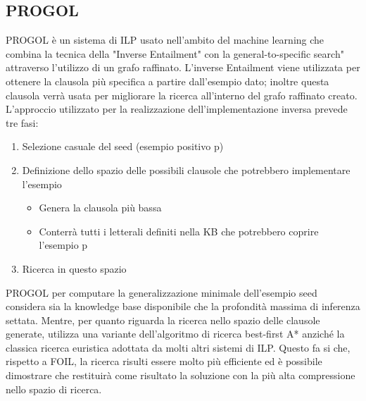 \subsection{PROGOL}
PROGOL è un sistema di ILP usato nell'ambito del machine learning che combina la tecnica della "Inverse Entailment" con la general-to-specific search" attraverso l'utilizzo di un grafo raffinato.
L'inverse Entailment viene utilizzata per ottenere la clausola più specifica a partire dall'esempio dato; inoltre questa clausola verrà usata per migliorare la ricerca all'interno del grafo raffinato creato.
L'approccio utilizzato per la realizzazione dell'implementazione inversa prevede tre fasi:
\begin{enumerate}
\item Selezione casuale del seed (esempio positivo p)
\item Definizione dello spazio delle possibili clausole che potrebbero implementare l'esempio
	\begin{itemize}
		\item Genera la clausola più bassa
		\item Conterrà tutti i letterali definiti nella KB che potrebbero coprire l'esempio p
	\end{itemize}
\item Ricerca in questo spazio 
\end{enumerate}
PROGOL per computare la generalizzazione minimale dell'esempio seed considera sia la knowledge base disponibile che la profondità massima di inferenza settata. Mentre, per quanto riguarda la ricerca nello spazio delle clausole generate, utilizza una variante dell'algoritmo di ricerca best-first A* anziché la classica ricerca euristica adottata da molti altri sistemi di ILP. Questo fa si che, rispetto a FOIL, la ricerca risulti essere molto più efficiente ed è possibile dimostrare che restituirà come risultato la soluzione con la più alta compressione nello spazio di ricerca.
\nocite{wiki:progol}

